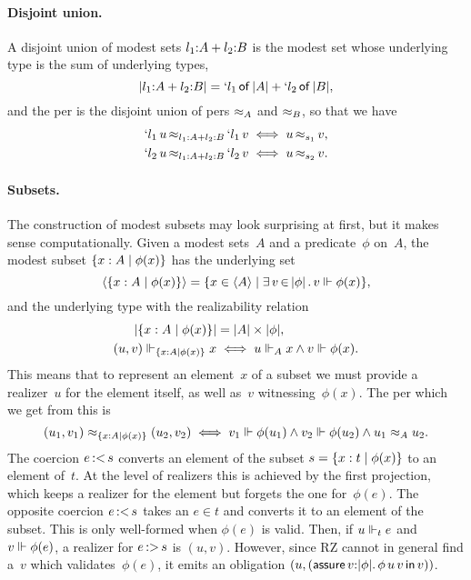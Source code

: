 \paragraph{Disjoint union.}
%
A disjoint union of modest sets $\isum{\il_1}{A}{\il_2}{B}$ is the
modest set whose underlying type is the sum of underlying types,
%
\begin{equation*}
  \typeOf{\isum{\il_1}{A}{\il_2}{B}} =
  \osumtyx{\il_1}{\typeOf{A}}{\il_2}{\typeOf{B}},
\end{equation*}
%
and the per is the disjoint union of pers $\per_{A}$ and $\per_{B}$, so
that we have
%
\begin{align*}
  \oper{\isum{\il_1}{A}{\il_2}{B}}{\oinj{\il_1}{u}}{\oinj{\il_1}{v}}
  &\iff \oper{s_1}{u}{v},
  \\
  \oper{\isum{\il_1}{A}{\il_2}{B}}{\oinj{\il_2}{u}}{\oinj{\il_2}{v}}
  &\iff \oper{s_2}{u}{v}.
\end{align*}
%

\paragraph{Subsets.}
%
The construction of modest subsets may look surprising at first, but
it makes sense computationally. Given a modest sets~$A$ and a
predicate~$\phi$ on~$A$, the modest subset $\set{x : A \such \phi(x)}$
has the underlying set
%
\begin{equation*}
  \setOf{\set{x : A \such \phi(x)}} =
  \set{x \in \setOf{A} \such \xsome{v}{\typeOf{\phi}}{v \rz \phi(x)}},
\end{equation*}
%
and the underlying type with the realizability relation
%
\begin{align*}
  \typeOf{\set{x : A \such \phi(x)}} &= \typeOf{A} \times
  \typeOf{\phi},\\
  (u,v) \rz_{\set{x : A \such \phi(x)}} x &\iff
  u \rz_A x \land v \rz \phi(x).
\end{align*}
%
This means that to represent an element~$x$ of a subset we must
provide a realizer~$u$ for the element itself, as well as~$v$
witnessing~$\phi(x)$. The per which we get from this is
%
\begin{equation*}
  (u_1, v_1) \per_{\set{x : A \such \phi(x)}} (u_2, v_2) \iff
  v_1 \rz \phi(u_1) \land v_2 \rz \phi(u_2) \land
  u_1 \per_A u_2.
\end{equation*}
%
The coercion $\isubout{e}{s}$ converts an element of the subset $s =
\set{x : t \such \phi(x)}$ to an element of~$t$. At the level of
realizers this is achieved by the first projection, which keeps a
realizer for the element but forgets the one for~$\phi(e)$. The
opposite coercion $\isubout{e}{s}$ takes an $e \in t$ and converts it
to an element of the subset. This is only well-formed when $\phi(e)$
is valid. Then, if $u \rz_t e$ and $v \rz \phi(e)$, a realizer for
$\isubin{e}{s}$ is $(u, v)$. However, since RZ cannot in general find
a~$v$ which validates~$\phi(e)$, it emits an obligation $(u,
(\ooblig{v}{\typeOf{\phi}}{\oapp{\oapp{\phi}{u}}{v}}{v}))$.

